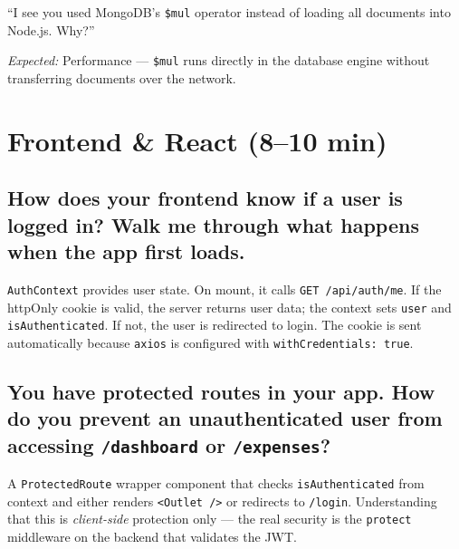 \documentclass[12pt, a4paper]{article}
\begin{document}
\begin{followup}
``I see you used MongoDB's \texttt{\$mul} operator instead of loading all documents into Node.js. Why?''

\medskip
\emph{Expected:} Performance — \texttt{\$mul} runs directly in the database engine without transferring documents over the network.
\end{followup}

\newpage

\section{Frontend \& React \textnormal{\textcolor{slatelight}{(8--10 min)}}}

\subsection{How does your frontend know if a user is logged in? Walk me through what happens when the app first loads.}

\begin{listenfor}
\texttt{AuthContext} provides user state. On mount, it calls \texttt{GET /api/auth/me}. If the httpOnly cookie is valid, the server returns user data; the context sets \texttt{user} and \texttt{isAuthenticated}. If not, the user is redirected to login. The cookie is sent automatically because \texttt{axios} is configured with \texttt{withCredentials: true}.
\end{listenfor}

\subsection{You have protected routes in your app. How do you prevent an unauthenticated user from accessing \texttt{/dashboard} or \texttt{/expenses}?}

\begin{listenfor}
A \texttt{ProtectedRoute} wrapper component that checks \texttt{isAuthenticated} from context and either renders \texttt{<Outlet />} or redirects to \texttt{/login}. Understanding that this is \emph{client-side} protection only — the real security is the \texttt{protect} middleware on the backend that validates the JWT.
\end{listenfor}
\end{document}
